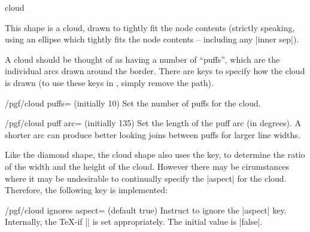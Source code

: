 \begin{shape}{cloud}

	This shape is a cloud, drawn to tightly fit the node contents 
	(strictly speaking, using an ellipse which tightly fits the node
	contents -- including any |inner sep|). 
	
\begin{codeexample}[]
\end{codeexample}

	A cloud should be thought of as having a number of ``puffs'', which
	are the individual arcs drawn around the border. There are \pgfname{}
	keys to specify how the cloud is drawn (to use these keys in 
	\tikzname{}, simply remove the  path).
	
	\begin{key}{/pgf/cloud puffs= (initially 10)}
	  Set the number of puffs for the cloud.
	\end{key}
	
	\begin{key}{/pgf/cloud puff arc= (initially 135)}
	  Set the length of the puff arc (in degrees). A shorter arc can 
	  produce better looking joins between puffs for larger line widths.
	\end{key}
	
	Like the diamond shape, the cloud shape also uses the 
	 key, to determine the ratio of the width and the 
	height of the cloud. However there may be cirumstances where it may
	be undesirable to continually specify the |aspect| for the cloud.
	Therefore, the following key is implemented:
	
	\begin{key}{/pgf/cloud ignores aspect= (default true)}
		Instruct \pgfname{} to ignore the |aspect| key. Internally, the
		\TeX-if |\ifpgfcloudignoresaspect| is set appropriately. The initial
		value is |false|.

\begin{codeexample}[]
\end{codeexample}	
	

\end{key}
\end{shape}
